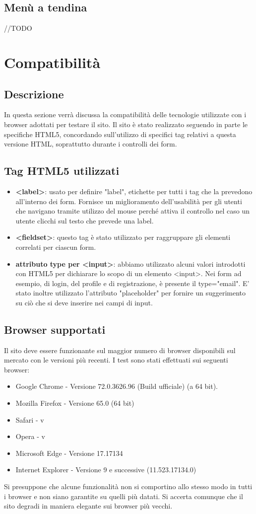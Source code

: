 \documentclass[12pt]{article}
\begin{document}
	\subsection{Menù a tendina}
	//TODO
	\section{Compatibilità}
	\subsection{Descrizione}
	In questa sezione verrà discussa la compatibilità delle tecnologie utilizzate con i browser adottati per testare il sito. Il sito è stato realizzato seguendo in parte le specifiche HTML5, concordando sull'utilizzo  di specifici tag relativi a questa versione HTML, soprattutto durante i controlli dei form.
	\subsection{Tag HTML5 utilizzati}
	\begin{itemize}
		\item \textbf{<label>}: usato per definire "label", etichette per tutti i tag che la prevedono all'interno dei form. Fornisce un miglioramento dell'usabilità per gli utenti che navigano tramite utilizzo del mouse perché attiva il controllo nel caso un utente clicchi sul testo che prevede una label.
		\item \textbf{<fieldset>}: questo tag è stato utilizzato per raggruppare gli elementi correlati per ciascun form.
		\item \textbf{attributo type per <input>}: abbiamo utilizzato alcuni valori introdotti con HTML5 per dichiarare lo scopo di un elemento <input>. Nei form ad esempio, di login, del profile e di registrazione, è presente il type="email".
		E' stato inoltre utilizzato l'attributo "placeholder" per fornire un suggerimento su ciò che si deve inserire nei campi di input.
	\end{itemize}
	\subsection{Browser supportati}
	Il sito deve essere funzionante sul maggior numero di browser disponibili sul mercato con le versioni più recenti. I test sono stati effettuati sui seguenti browser:
		\begin{itemize}
			\item Google Chrome - Versione 72.0.3626.96 (Build ufficiale) (a 64 bit).
			\item Mozilla Firefox - Versione 65.0 (64 bit)
			\item Safari - v
			\item Opera - v
			\item Microsoft Edge - Versione 17.17134
			\item Internet Explorer - Versione 9 e successive (11.523.17134.0)
		\end{itemize}
	Si presuppone che alcune funzionalità non si comportino allo stesso modo in tutti i browser e non siano garantite su quelli più datati. Si accerta comunque che il sito degradi in	maniera elegante sui browser più vecchi.
\end{document}

